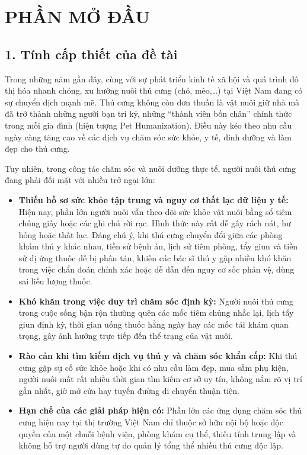 \chapter*{PHẦN MỞ ĐẦU}

\section*{1. Tính cấp thiết của đề tài}

Trong những năm gần đây, cùng với sự phát triển kinh tế xã hội và quá trình đô thị hóa nhanh chóng, xu hướng nuôi thú cưng (chó, mèo,\dots) tại Việt Nam đang có sự chuyển dịch mạnh mẽ. Thú cưng không còn đơn thuần là vật nuôi giữ nhà mà đã trở thành những người bạn tri kỷ, những ``thành viên bốn chân'' chính thức trong mỗi gia đình (hiện tượng Pet Humanization). Điều này kéo theo nhu cầu ngày càng tăng cao về các dịch vụ chăm sóc sức khỏe, y tế, dinh dưỡng và làm đẹp cho thú cưng.

Tuy nhiên, trong công tác chăm sóc và nuôi dưỡng thực tế, người nuôi thú cưng đang phải đối mặt với nhiều trở ngại lớn:
\begin{itemize}
    \item \textbf{Thiếu hồ sơ sức khỏe tập trung và nguy cơ thất lạc dữ liệu y tế:} Hiện nay, phần lớn người nuôi vẫn theo dõi sức khỏe vật nuôi bằng sổ tiêm chủng giấy hoặc các ghi chú rời rạc. Hình thức này rất dễ gây rách nát, hư hỏng hoặc thất lạc. Đáng chú ý, khi thú cưng chuyển đổi giữa các phòng khám thú y khác nhau, tiền sử bệnh án, lịch sử tiêm phòng, tẩy giun và tiền sử dị ứng thuốc dễ bị phân tán, khiến các bác sĩ thú y gặp nhiều khó khăn trong việc chẩn đoán chính xác hoặc dễ dẫn đến nguy cơ sốc phản vệ, dùng sai liều lượng thuốc.
    \item \textbf{Khó khăn trong việc duy trì chăm sóc định kỳ:} Người nuôi thú cưng trong cuộc sống bận rộn thường quên các mốc tiêm chủng nhắc lại, lịch tẩy giun định kỳ, thời gian uống thuốc hằng ngày hay các mốc tái khám quan trọng, gây ảnh hưởng trực tiếp đến thể trạng của vật nuôi.
    \item \textbf{Rào cản khi tìm kiếm dịch vụ thú y và chăm sóc khẩn cấp:} Khi thú cưng gặp sự cố sức khỏe hoặc khi có nhu cầu làm đẹp, mua sắm phụ kiện, người nuôi mất rất nhiều thời gian tìm kiếm cơ sở uy tín, không nắm rõ vị trí gần nhất, giờ mở cửa hay tuyến đường di chuyển thuận tiện.
    \item \textbf{Hạn chế của các giải pháp hiện có:} Phần lớn các ứng dụng chăm sóc thú cưng hiện nay tại thị trường Việt Nam chỉ thuộc sở hữu nội bộ hoặc độc quyền của một chuỗi bệnh viện, phòng khám cụ thể, thiếu tính trung lập và không hỗ trợ người dùng tự do quản lý tổng thể nhiều thú cưng độc lập.
\end{itemize}

